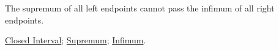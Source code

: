 \begin{remark*}[Interpretation]
The supremum of all left endpoints cannot pass the infimum of all right
endpoints.
\end{remark*}

\begin{dependencies}
\hyperref[def:closed-interval]{Closed Interval};
\hyperref[def:supremum]{Supremum};
\hyperref[def:infimum]{Infimum}.
\end{dependencies}



